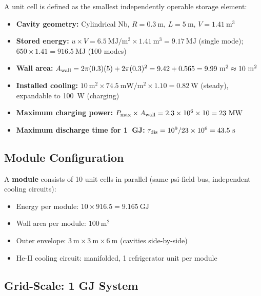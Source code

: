 \documentclass[aps,prd,twocolumn,superscriptaddress]{revtex4-2}
\newcommand{\Pmax}{P_{\rm max}}
\begin{document}
A unit cell is defined as the smallest independently operable storage
element:
\begin{itemize}
\item \textbf{Cavity geometry:} Cylindrical Nb, $R = 0.3~\mathrm{m}$,
  $L = 5~\mathrm{m}$, $V = 1.41~\mathrm{m^3}$
\item \textbf{Stored energy:} $u \times V = 6.5~\mathrm{MJ/m^3}\times
  1.41~\mathrm{m^3} = 9.17~\mathrm{MJ}$ (single mode);
  $650\times 1.41 = 916.5~\mathrm{MJ}$ (100 modes)
\item \textbf{Wall area:} $A_{\rm wall} = 2\pi(0.3)(5) + 2\pi(0.3)^2
  = 9.42 + 0.565 = 9.99~\mathrm{m^2} \approx 10~\mathrm{m^2}$
\item \textbf{Installed cooling:} $10~\mathrm{m^2} \times 74.5~\mathrm{mW/m^2}
  \times 1.10 = 0.82~\mathrm{W}$ (steady), expandable to 100~W (charging)
\item \textbf{Maximum charging power:} $\Pmax \times A_{\rm wall}
  = 2.3\times 10^6\times 10 = 23~\mathrm{MW}$
\item \textbf{Maximum discharge time for 1~GJ:} $\tau_{\rm dis}
  = 10^9 / 23\times 10^6 = 43.5~\mathrm{s}$
\end{itemize}

\subsection{Module Configuration}

A \textbf{module} consists of 10 unit cells in parallel (same psi-field
bus, independent cooling circuits):
\begin{itemize}
\item Energy per module: $10\times 916.5 = 9.165~\mathrm{GJ}$
\item Wall area per module: $100~\mathrm{m^2}$
\item Outer envelope: $3~\mathrm{m} \times 3~\mathrm{m} \times 6~\mathrm{m}$
  (cavities side-by-side)
\item He-II cooling circuit: manifolded, 1 refrigerator unit per module
\end{itemize}

\subsection{Grid-Scale: 1 GJ System}
\end{document}
